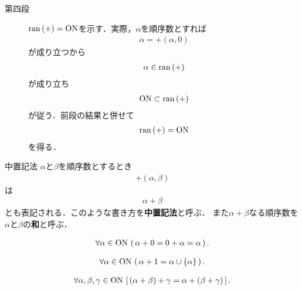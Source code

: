 \begin{sketch}
\begin{description}
			\item[第四段] $\operatorname*{ran} \left(+\right) = \mathrm{ON}$を示す．実際，$\alpha$を順序数とすれば
				\begin{align}
					\alpha = +(\alpha,0)
				\end{align}
				が成り立つから
				\begin{align}
					\alpha \in \operatorname*{ran} \left(+\right)
				\end{align}
				が成り立ち
				\begin{align}
					\mathrm{ON} \subset \operatorname*{ran} \left(+\right)
				\end{align}
				が従う．前段の結果と併せて
				\begin{align}
					\operatorname*{ran} \left(+\right) = \mathrm{ON}
				\end{align}
				を得る．
				\QED
		\end{description}
	\end{sketch}
	
	\begin{itembox}[l]{中置記法}
		$\alpha$と$\beta$を順序数とするとき
		\begin{align}
			+(\alpha,\beta)
		\end{align}
		は
		\begin{align}
			\alpha + \beta
		\end{align}
		とも表記される．このような書き方を{\bf 中置記法}と呼ぶ．
		また$\alpha + \beta$なる順序数を$\alpha$と$\beta$の{\bf 和}と呼ぶ．
	\end{itembox}
	
	\begin{screen}
		\begin{thm}
			\begin{align}
				\forall \alpha \in \mathrm{ON}\, \left(\, \alpha + 0 = 0 + \alpha = \alpha\, \right).
			\end{align}
		\end{thm}
	\end{screen}
	
	\begin{screen}
		\begin{thm}
			\begin{align}
				\forall \alpha \in \mathrm{ON}\, \left(\, \alpha + 1 = \alpha \cup \{\alpha\}\, \right).
			\end{align}
		\end{thm}
	\end{screen}
	
	\begin{screen}
		\begin{thm}[加法は結合的]
			\begin{align}
				\forall \alpha,\beta,\gamma \in \mathrm{ON}\, \left[\, (\alpha + \beta) + \gamma = \alpha + (\beta + \gamma)\, \right].
			\end{align}
		\end{thm}
	\end{screen}
	
